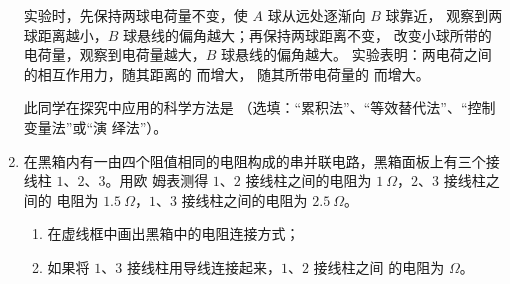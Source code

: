 \begin{enumerate}
实验时，先保持两球电荷量不变，使 $ A $ 球从远处逐渐向 $ B $ 球靠近，
观察到两球距离越小，$ B $ 球悬线的偏角越大；再保持两球距离不变，
改变小球所带的电荷量，观察到电荷量越大，$ B $ 球悬线的偏角越大。
实验表明：两电荷之间的相互作用力，随其距离的 \underlinegap 而增大，
随其所带电荷量的 \underlinegap 而增大。

此同学在探究中应用的科学方法是 \underlinegap （选填：“累积法”、“等效替代法”、“控制变量法”或“演
绎法”）。









\item
{}
在黑箱内有一由四个阻值相同的电阻构成的串并联电路，黑箱面板上有三个接线柱 $ 1 $、$ 2 $、$ 3 $。用欧
姆表测得 $ 1 $、$ 2 $ 接线柱之间的电阻为 $ 1 \ \Omega $，$ 2 $、$ 3 $ 接线柱之间的
电阻为 $ 1.5 \ \Omega $，$ 1 $、$ 3 $ 接线柱之间的电阻为 $ 2.5 \ \Omega $。
\begin{enumerate}
\item
在虚线框中画出黑箱中的电阻连接方式；
\begin{figure}[h!]
\centering

\end{figure}

\item 
如果将 $ 1 $、$ 3 $ 接线柱用导线连接起来，$ 1 $、$ 2 $ 接线柱之间
的电阻为 \underlinegap $ \Omega $。


\end{enumerate}







\end{enumerate}
